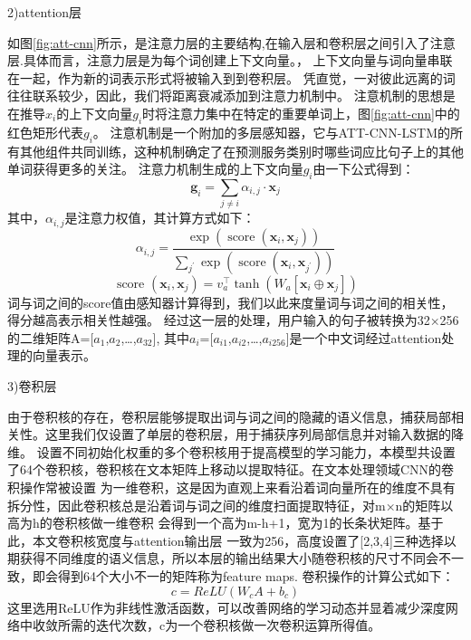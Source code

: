   2)attention层

  如图\ref{fig:att-cnn}所示，是注意力层的主要结构,在输入层和卷积层之间引入了注意层.具体而言，注意力层是为每个词创建上下文向量。，
  上下文向量与词向量串联在一起，作为新的词表示形式将被输入到到卷积层。 凭直觉，一对彼此远离的词往往联系较少，因此，我们将距离衰减添加到注意力机制中。 
  注意机制的思想是在推导$x_{i}$的上下文向量$g_{i}$时将注意力集中在特定的重要单词上，图\ref{fig:att-cnn}中的红色矩形代表$g_{i}$。 
  注意机制是一个附加的多层感知器，它与ATT-CNN-LSTM的所有其他组件共同训练，这种机制确定了在预测服务类别时哪些词应比句子上的其他单词获得更多的关注。
  注意力机制生成的上下文向量$g_{i}$由一下公式得到：
  \begin{equation}
  \mathbf{g}_{i}=\sum_{j \neq i} \alpha_{i, j} \cdot \mathbf{x}_{j}
\end{equation}
其中，$\alpha_{i, j}$是注意力权值，其计算方式如下：
\begin{equation}
\alpha_{i, j}=\frac{\exp \left(\operatorname{score}\left(\mathbf{x}_{i}, \mathbf{x}_{j}\right)\right)}{\sum_{j^{\prime}} \exp \left(\operatorname{score}\left(\mathbf{x}_{i}, \mathbf{x}_{j^{\prime}}\right)\right)}
\end{equation}
\begin{equation}
\text { score }\left(\mathbf{x}_{i}, \mathbf{x}_{j}\right)=v_{a}^{\top} \tanh \left(W_{a}\left[\mathbf{x}_{i} \oplus \mathbf{x}_{j}\right]\right)
\end{equation}
词与词之间的score值由感知器计算得到，我们以此来度量词与词之间的相关性，得分越高表示相关性越强。
经过这一层的处理，用户输入的句子被转换为32×256的二维矩阵A=[$a_{1}$,$a_{2}$,\dots,$a_{32}$],
其中$a_{i}$=[$a_{i1}$,$a_{i2}$,\dots,$a_{i256}$]是一个中文词经过attention处理的向量表示。

  3)卷积层

  由于卷积核的存在，卷积层能够提取出词与词之间的隐藏的语义信息，捕获局部相关性。这里我们仅设置了单层的卷积层，用于捕获序列局部信息并对输入数据的降维。
  设置不同初始化权重的多个卷积核用于提高模型的学习能力，本模型共设置了64个卷积核，卷积核在文本矩阵上移动以提取特征。在文本处理领域CNN的卷积操作常被设置
  为一维卷积，这是因为直观上来看沿着词向量所在的维度不具有拆分性，因此卷积核总是沿着词与词之间的维度扫面提取特征，对m×n的矩阵以高为h的卷积核做一维卷积
  会得到一个高为m-h+1，宽为1的长条状矩阵。基于此，本文卷积核宽度与attention输出层
  一致为256，高度设置了[2,3,4]三种选择以期获得不同维度的语义信息，所以本层的输出结果大小随卷积核的尺寸不同会不一致，即会得到64个大小不一的矩阵称为feature maps.
  卷积操作的计算公式如下：
  \begin{equation}
    c=ReLU(W_{c}A+b_{c})
    \end{equation}
    这里选用ReLU作为非线性激活函数，可以改善网络的学习动态并显着减少深度网络中收敛所需的迭代次数，c为一个卷积核做一次卷积运算所得值。


